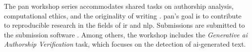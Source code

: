The \ac{pan} workshop series accommodates shared tasks %
on authorship analysis, computational ethics, and the originality of writing \cite{ayele_overview_nodate}.
\ac{pan}'s goal is to contribute to reproducible research in the fields of \ac{ir} and \ac{nlp}.
Submissions are submitted to the submission software \tira{}.
Among others, the workshop includes the \textit{Generative \ac{ai} Authorship Verification} task, which focuses on the detection of \ac{ai}-generated text.
